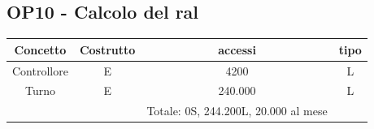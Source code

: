     \subsection*{OP10 - Calcolo del ral}
    \begin{table}[H]
    \centering
    \begin{tabular}{|c|c|c|c|}
    \hline
    \rowcolor{green!70!black!80}
    \textbf{Concetto} & \textbf{Costrutto} & \textbf{accessi} & \textbf{tipo}\\
    \hline
    Controllore & E & 4200 & L \\
    Turno & E & 240.000 & L \\
    & & Totale: 0S, 244.200L, 20.000 al mese &\\
    \hline
    \end{tabular}
    \end{table}
  
